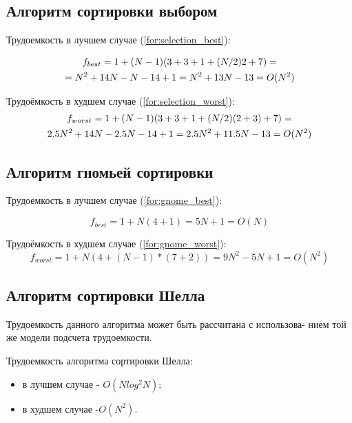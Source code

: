 \subsection{Алгоритм сортировки выбором}

Трудоемкость в лучшем случае (\ref{for:selection_best}):

\begin{gather}
	\label{for:selection_best}
    f_{best} = 1 + (N - 1)(3 + 3 + 1 + (N / 2)2 + 7) =\notag \\
    = N^2 + 14N - N - 14 + 1 = N^2 + 13N - 13  = O(N^2)
\end{gather}

Трудоёмкость в худшем случае (\ref{for:selection_worst}):
\begin{gather}
	\label{for:selection_worst}
    f_{worst} = 1 + (N - 1)(3 + 3 + 1 + (N / 2)(2 + 3) + 7) =\notag \\ 2.5N^2 + 14N - 2.5N - 14 + 1 = 2.5N^2 + 11.5N - 13 = O(N^2)
\end{gather}

\subsection{Алгоритм гномьей сортировки}

Трудоемкость в лучшем случае (\ref{for:gnome_best}):

\begin{equation}
	\label{for:gnome_best}
    f_{best} = 1 + N(4 + 1) = 5N + 1 = O(N)
\end{equation}

Трудоёмкость в худшем случае (\ref{for:gnome_worst}):
\begin{equation}
	\label{for:gnome_worst}
    f_{worst} = 1 + N(4 + (N - 1) * (7 + 2)) = 9N^2 - 5N + 1 = O(N^2)
\end{equation}

\subsection{Алгоритм сортировки Шелла}

Трудоемкость данного алгоритма может быть рассчитана с использова-
нием той же модели подсчета трудоемкости.

Трудоемкость алгоритма сортировки Шелла:

\begin{itemize}
	\item в лучшем случае - $O(Nlog^2N)$;
	\item в худшем случае -$O(N^2)$.
\end{itemize}

